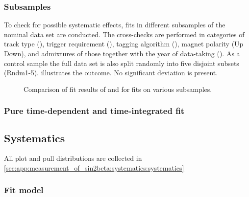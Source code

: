 \subsubsection{Subsamples}
\label{sec:measurement_of_sin2beta:systematics:cross_checks:subsamples}
%
To check for possible systematic effects, fits in different subsamples of the
nominal data set are conducted. The cross-checks are performed in categories of
track type (\catDD \vs \catLL), trigger requirement (\catAU \vs \catEB), tagging
algorithm (\catOS \vs \catSS \vs \catBS), magnet polarity (Up \vs Down), and
admixtures of those together with the year of data-taking (\catOO \vs \catOT).
As a control sample the full data set is also split randomly into five disjoint
subsets (Rndm1-5). 
illustrates the outcome. No significant deviation is present.
%
\begin{figure}
\centering


\caption{
Comparison of fit results of \SJpsiKS and \CJpsiKS for fits on various
subsamples.}
\label{fig:measurement_of_sin2beta:systematics:cross_checks:subsamples:s_and_c}
\end{figure}

\subsubsection{Pure time-dependent and time-integrated fit}
\label{sec:measurement_of_sin2beta:systematics:cross_checks:time_integrated}


\subsection{Systematics}
\label{sec:measurement_of_sin2beta:systematics:systematics}


All plot and pull distributions are collected in
\cref{sec:app:measurement_of_sin2beta:systematics:systematics}

\subsubsection{Fit model}
\label{sec:measurement_of_sin2beta:systematics:systematics:fit_model}

